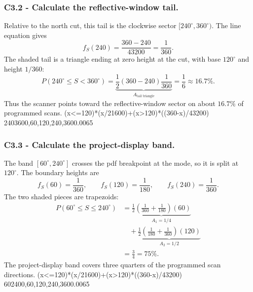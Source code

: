 	\subsubsection*{C3.2 - Calculate the reflective-window tail.}
	\label{subsec:c3-triangular-scanner-b}
	Relative to the north cut, this tail is the clockwise sector
	$[240^\circ,360^\circ)$.  The line equation gives
	\[
	f_S(240)=\frac{360-240}{43200}=\frac1{360}.
	\]
	The shaded tail is a triangle ending at zero height at the cut, with base
	$120^\circ$ and height $1/360$:
	\[
	P(240^\circ\le S<360^\circ)
	=\underbrace{\frac12(360-240)\frac1{360}}_{A_{\text{tail triangle}}}
	=\frac16\approx16.7\%.
	\]
	Thus the scanner points toward the reflective-window sector on about $16.7\%$
	of programmed scans.
	\begingroup
	{(x<=120)*(x/21600)+(x>120)*((360-x)/43200)}
	{240}{360}{0,60,120,240,360}{0.0065}
	\endgroup
	
	\subsubsection*{C3.3 - Calculate the project-display band.}
	\label{subsec:c3-triangular-scanner-c}
	The band $[60^\circ,240^\circ]$ crosses the pdf breakpoint at the mode, so it
	is split at $120^\circ$.  The boundary heights are
	\[
	f_S(60)=\frac1{360},\qquad f_S(120)=\frac1{180},
	\qquad f_S(240)=\frac1{360}.
	\]
	The two shaded pieces are trapezoids:
	\[
	\begin{aligned}
		P(60^\circ\le S\le240^\circ)
		&=\underbrace{\frac12\left(\frac1{360}+\frac1{180}\right)(60)}
		_{A_1=1/4}\\
		&\quad+\underbrace{\frac12\left(\frac1{180}+\frac1{360}\right)(120)}
		_{A_2=1/2}\\
		&=\frac34=75\%.
	\end{aligned}
	\]
	The project-display band covers three quarters of the programmed scan
	directions.
	\begingroup
	{(x<=120)*(x/21600)+(x>120)*((360-x)/43200)}
	{60}{240}{0,60,120,240,360}{0.0065}
	\endgroup
	
